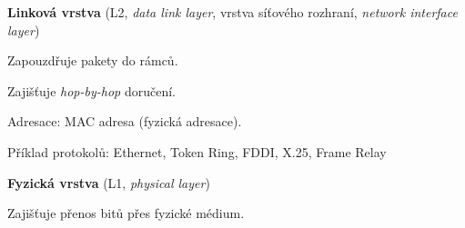 \begin{compactitem}
    \item \textbf{Linková vrstva} (L2, \textit{data link layer}, vrstva síťového rozhraní, \textit{network interface layer}) \begin{compactitem}
        \item Zapouzdřuje pakety do rámců.
        \item Zajišťuje \textit{hop-by-hop} doručení.
        \item Adresace: MAC adresa (fyzická adresace).
        \item Příklad protokolů: Ethernet, Token Ring, FDDI, X.25, Frame Relay
    \end{compactitem}

    \item \textbf{Fyzická vrstva} (L1, \textit{physical layer}) \begin{compactitem}
        \item Zajišťuje přenos bitů přes fyzické médium.
    \end{compactitem}
\end{compactitem}

